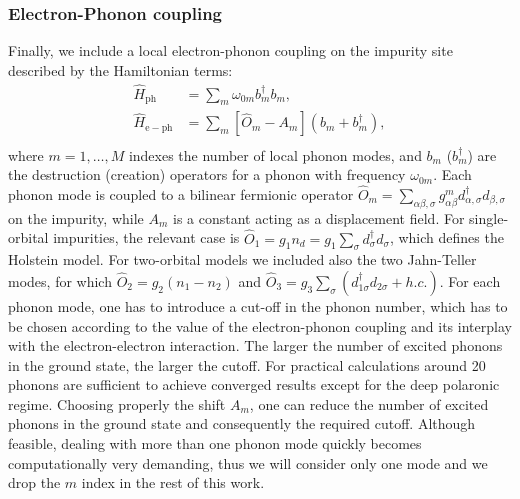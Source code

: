 \documentclass[edipack_sp.tex]{subfiles}
\begin{document}
\subsubsection{Electron-Phonon coupling}
Finally, we include a local electron-phonon coupling on the impurity site
described by the Hamiltonian terms: 
\begin{equation}\label{Hph}
  \begin{split}
    \hat{H}_\mathrm{ph}&=\sum_m \omega_{0m} b_m^\dagger b_m,   \\
    \hat{H}_\mathrm{e-ph} &= \sum_m [ \hat{O}_m - A_m](b_m+b_m^\dagger), \\
\end{split}
\end{equation}
where $m=1,\dots,M$ indexes the number of local phonon modes, and $b_m$
($b_m^\dagger$) are the destruction (creation) operators for a phonon with
frequency $\omega_{0m}$. Each phonon mode is coupled to a bilinear fermionic operator $\hat{O}_m= \sum_{\alpha \beta, \sigma }g^{m}_{\alpha \beta} d^\dagger_{\alpha, \sigma} d_{\beta, \sigma}$ on the impurity, while $A_m$ is a constant acting as a displacement field.  %
For single-orbital impurities, the relevant case is $\hat{O}_1 = g_1 n_d = g_1 \sum_{\sigma} d^{\dagger}_{\sigma}d_{\sigma}$, which defines the Holstein model\cite{Holstein1959APNY}. For two-orbital models we included also the two Jahn-Teller modes\cite{Capone2010ACMP}, for which $\hat{O}_2 = g_2(n_1 - n_2)$\cite{Scazzola2023PRB} and $\hat{O}_3 = g_3 \sum_{\sigma} (d^{\dagger}_{1\sigma}d_{2\sigma}+ h.c.)$. For each phonon mode, one has to introduce a cut-off in the phonon number, which has to be chosen according to the value of the electron-phonon coupling\cite{Capone2003PRL,Capone2006PRB} and its interplay with the electron-electron interaction\cite{Capone2004PRL,Capone2004PRLsc,Sangiovanni2005PRB,Paci2005PRL,Sangiovanni2006PRL,Sangiovanni2006PRB_ph,Paci2006PRB}. The larger the number of excited phonons in the ground state, the larger the cutoff. For practical calculations around 20 phonons are sufficient to achieve converged results except for the deep polaronic regime\cite{Capone2003PRL}.
Choosing properly the shift $A_m$, one can reduce the number of excited phonons in the ground state and consequently the required cutoff. 
Although feasible, dealing with more than one phonon mode quickly becomes computationally very demanding, thus we will consider only one mode and we drop the $m$ index in the rest of this work.
\end{document}

